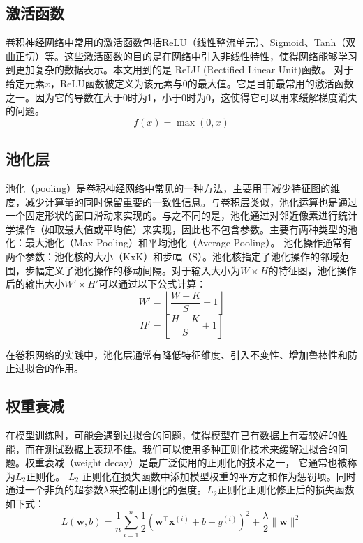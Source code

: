 \subsection{激活函数}
卷积神经网络中常用的激活函数包括ReLU（线性整流单元）、Sigmoid、Tanh（双曲正切）等。这些激活函数的目的是在网络中引入非线性特性，使得网络能够学习到更加复杂的数据表示。本文用到的是 ReLU (Rectified Linear Unit)函数。
对于给定元素$x$，ReLU函数被定义为该元素与$0$的最大值。它是目前最常用的激活函数之一。因为它的导数在大于0时为1，小于0时为0，这使得它可以用来缓解梯度消失的问题。
\begin{equation}
  f(x) = \max(0, x)
\end{equation}

\subsection{池化层}
池化（pooling）是卷积神经网络中常见的一种方法，主要用于减少特征图的维度，减少计算量的同时保留重要的一致性信息。与卷积层类似，池化运算也是通过一个固定形状的窗口滑动来实现的。与之不同的是，池化通过对邻近像素进行统计学操作（如取最大值或平均值）来实现，因此也不包含参数。主要有两种类型的池化：最大池化（Max Pooling）和平均池化（Average Pooling）。
池化操作通常有两个参数：池化核的大小（KxK）和步幅（S）。池化核指定了池化操作的邻域范围，步幅定义了池化操作的移动间隔。对于输入大小为$W \times H$的特征图，池化操作后的输出大小$W' \times H'$可以通过以下公式计算：
\begin{equation}
  W' = \left\lfloor\frac{W - K}{S} + 1\right\rfloor
\end{equation}
\begin{equation}
  H' = \left\lfloor\frac{H - K}{S} + 1\right\rfloor
\end{equation}

在卷积网络的实践中，池化层通常有降低特征维度、引入不变性、增加鲁棒性和防止过拟合的作用。

\subsection{权重衰减}
在模型训练时，可能会遇到过拟合的问题，使得模型在已有数据上有着较好的性能，而在测试数据上表现不佳。我们可以使用多种正则化技术来缓解过拟合的问题。权重衰减（weight decay）是最广泛使用的正则化的技术之一， 它通常也被称为$L_2$正则化。
$L_2$ 正则化在损失函数中添加模型权重的平方之和作为惩罚项。同时通过一个非负的超参数$\lambda$来控制正则化的强度。$L_2$正则化正则化修正后的损失函数如下式：
\begin{equation}
  L(\mathbf{w}, b)=\frac{1}{n} \sum_{i=1}^{n} \frac{1}{2}\left(\mathbf{w}^{\top} \mathbf{x}^{(i)}+b-y^{(i)}\right)^{2}+\frac{\lambda}{2}\|\mathbf{w}\|^{2}
\end{equation}

